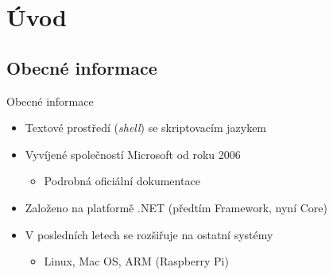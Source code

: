 \documentclass[main.tex]{subfiles}
\begin{document}
\section{Úvod}

\subsection{Obecné informace}
\begin{frame}[fragile]{Obecné informace}
  \begin{itemize}
    \item Textové prostředí (\textit{shell}) se skriptovacím jazykem
    \item Vyvíjené společností Microsoft od roku 2006
      \begin{itemize}
        \item Podrobná oficiální dokumentace
      \end{itemize}
    \item Založeno na platformě .NET (předtím Framework, nyní Core)
    \item V posledních letech se rozšiřuje na ostatní systémy
      \begin{itemize}
        \item Linux, Mac OS, ARM (Raspberry Pi)
      \end{itemize}
  \end{itemize}
\end{frame}
\end{document}

